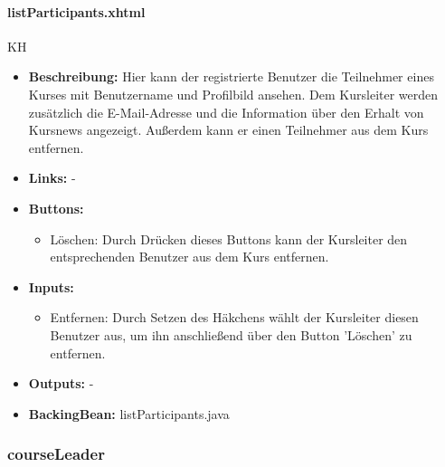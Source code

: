 				\paragraph{listParticipants.xhtml}
					KH\\
					\begin{itemize}
						\item \textbf{Beschreibung:} Hier kann der registrierte Benutzer die Teilnehmer eines Kurses mit Benutzername und Profilbild ansehen. Dem Kursleiter werden zusätzlich die E-Mail-Adresse und die Information über den Erhalt von Kursnews angezeigt. Außerdem kann er einen Teilnehmer aus dem Kurs entfernen.
						\item \textbf{Links:} -
						\item \textbf{Buttons:}
							\begin{itemize}
								\item Löschen: Durch Drücken dieses Buttons kann der Kursleiter den entsprechenden Benutzer aus dem Kurs entfernen.
							\end{itemize}
						\item \textbf{Inputs:}
							 \begin{itemize}
							 	\item Entfernen: Durch Setzen des Häkchens wählt der Kursleiter diesen Benutzer aus, um ihn anschließend über den Button 'Löschen' zu entfernen.
							 \end{itemize}
						\item \textbf{Outputs:} -
						\item \textbf{BackingBean:} listParticipants.java
					\end{itemize}
			
			\subsubsection{courseLeader}
			
